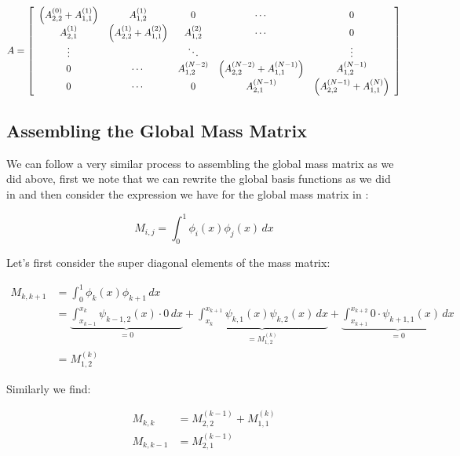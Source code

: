 \begin{equation}\label{eq:oned-deterministic-global-stiffness}
    A = \left[\begin{array}{c c c c c}
         \left(A^{(0)}_{2,2} + A^{(1)}_{1,1}\right) & A^{(1)}_{1,2} & 0 & \cdots & 0 \\
         A^{(1)}_{2,1} & \left(A^{(1)}_{2,2} + A^{(2)}_{1,1}\right) & A^{(2)}_{1,2} & \cdots & 0 \\
         \vdots & & \ddots  & & \vdots \\
         0 & \cdots & A^{(N-2)}_{1,2} & \left(A^{(N-2)}_{2,2} + A^{(N-1)}_{1,1}\right)& A^{(N-1)}_{1,2} \\
         0 & \cdots & 0 & A^{(N-1)}_{2,1} & \left(A^{(N-1)}_{2,2} + A^{(N)}_{1,1}\right)
        \end{array}\right]
\end{equation}

\subsection{Assembling the Global Mass Matrix}\label{sec:oned-deterministic-global-mass-assembly}

We can follow a very similar process to assembling the global mass matrix as we
did above, first we note that we can rewrite the global basis functions as we
did in  and then consider the
expression we have for the global mass matrix in
:

\[
    M_{i,j} = \int_0^1\phi_i(x)\phi_j(x)\, dx
\]

Let's first consider the super diagonal elements of the mass matrix:

\begin{align*}
    M_{k,k+1} &= \int_0^1\phi_k(x)\phi_{k+1}\, dx \\
              &= \underbrace{\int_{x_{k-1}}^{x_k}\psi_{k-1,2}(x) \cdot 0\, dx}_{ = 0}
               + \underbrace{\int_{x_k}^{x_{k+1}}\psi_{k,1}(x)\psi_{k,2}(x)\, dx}_{= M^{(k)}_{1,2}}
               + \underbrace{\int_{x_{k+1}}^{x_{k+2}}0 \cdot \psi_{k+1,1}(x)\, dx}_{= 0} \\
              &= M^{(k)}_{1,2}
\end{align*}

Similarly we find:

\begin{align*}
    M_{k,k} &= M^{(k-1)}_{2,2} + M^{(k)}_{1,1} \\
    M_{k,k-1} &= M^{(k-1)}_{2,1}
\end{align*}

